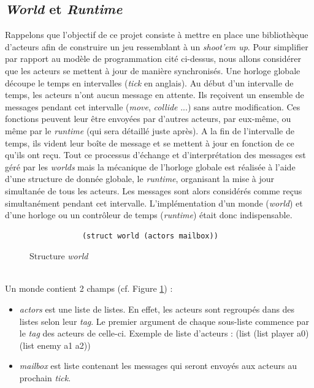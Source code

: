 \documentclass{article}
\begin{document}
\subsection{\textit{World} et \textit{Runtime}}
   Rappelons que l'objectif de ce projet consiste à mettre en place une bibliothèque d'acteurs afin de construire un jeu ressemblant à un \textit{shoot'em up}. Pour simplifier par rapport au modèle de programmation cité ci-dessus, nous allons considérer que les acteurs se mettent à jour de manière synchronisés. Une horloge globale découpe le temps en intervalles (\textit{tick} en anglais). Au début d'un intervalle de temps, les acteurs n'ont aucun message en attente. Ils reçoivent un ensemble de messages pendant cet intervalle (\textit{move}, \textit{collide} ...) sans autre modification. Ces fonctions peuvent leur être envoyées par d'autres acteurs, par eux-même, ou même par le \textit{runtime} (qui sera détaillé juste après). A la fin de l'intervalle de temps, ils vident leur boîte de message et se mettent à jour en fonction de ce qu'ils ont reçu. Tout ce processus d'échange et d'interprétation des messages est géré par les \textit{worlds} mais la mécanique de l'horloge globale est réalisée à l'aide d'une structure de donnée globale, le \textit{runtime}, organisant la mise à jour simultanée de tous les acteurs. Les messages sont alors considérés comme reçus simultanément pendant cet intervalle. L'implémentation d'un monde (\textit{world}) et d'une horloge ou un contrôleur de temps (\textit{runtime}) était donc indispensable.
    \begin{figure}[h]
      \centering
        \begin{verbatim}
            (struct world (actors mailbox))
        \end{verbatim}
      \caption{Structure \textit{world}}
      \label{fig:world}
  \end{figure}
  \\
  Un monde contient 2 champs (cf. Figure \ref{fig:world}) : 
  \begin{itemize}
      \item \textit{actors} est une liste de listes. En effet, les acteurs sont regroupés dans des listes selon leur \textit{tag}. Le premier argument de chaque sous-liste commence par le \textit{tag} des acteurs de celle-ci. Exemple de liste d'acteurs : (list (list player a0) (list enemy a1 a2))   
      \item \textit{mailbox} est liste contenant les messages qui seront envoyés aux acteurs au prochain \textit{tick}.
  \end{itemize}
  
\end{document}
